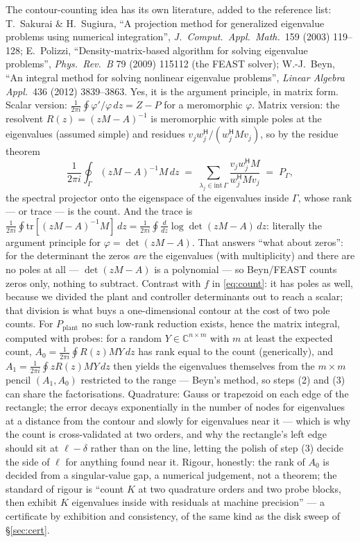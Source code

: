 \documentclass[11pt,a4paper]{article}
\newcommand{\C}{\mathbb{C}}
\newcommand{\hp}{^{\mathsf H}}
\begin{document}
{The contour-counting idea has its own literature, added to the reference list:
T.~Sakurai \& H.~Sugiura, ``A projection method for generalized
eigenvalue problems using numerical integration'', \emph{J.\ Comput.\ Appl.\ Math.}\ 159
(2003) 119--128; E.~Polizzi, ``Density-matrix-based algorithm for solving eigenvalue
problems'', \emph{Phys.\ Rev.\ B} 79 (2009) 115112 (the FEAST solver); W.-J.~Beyn, ``An
integral method for solving nonlinear eigenvalue problems'', \emph{Linear Algebra Appl.}\
436 (2012) 3839--3863.  Yes, it is the argument principle, in matrix form.  Scalar
version: $\tfrac1{2\pi i}\oint\varphi'/\varphi\,dz=Z-P$ for a meromorphic $\varphi$.
Matrix version: the resolvent $R(z)=(zM-A)^{-1}$ is meromorphic with simple poles at the
eigenvalues (assumed simple) and residues $v_jw_j\hp/(w_j\hp Mv_j)$, so by the residue
theorem
\[
\frac1{2\pi i}\oint_\Gamma (zM-A)^{-1}M\,dz
\;=\;\sum_{\lambda_j\in\mathrm{int}\,\Gamma}\frac{v_jw_j\hp M}{w_j\hp Mv_j}
\;=\;P_\Gamma ,
\]
the spectral projector onto the eigenspace of the eigenvalues inside $\Gamma$, whose rank
--- or trace --- is the count.  And the trace is
$\tfrac1{2\pi i}\oint\mathrm{tr}[(zM-A)^{-1}M]\,dz
=\tfrac1{2\pi i}\oint\tfrac{d}{dz}\log\det(zM-A)\,dz$: literally the argument principle
for $\varphi=\det(zM-A)$.  That answers ``what about zeros'': for the determinant the
zeros \emph{are} the eigenvalues (with multiplicity) and there are no poles at all ---
$\det(zM-A)$ is a polynomial --- so Beyn/FEAST counts zeros only, nothing to subtract.
Contrast with $f$ in \eqref{eq:count}: it has poles as well, because we divided the plant
and controller determinants out to reach a scalar; that division is what buys a
one-dimensional contour at the cost of two pole counts.  For $P_{\mathrm{plant}}$ no
such low-rank reduction exists, hence the matrix integral, computed with probes: for a
random $Y\in\C^{n\times m}$ with $m$ at least the expected count,
$A_0=\tfrac1{2\pi i}\oint R(z)MY\,dz$ has rank equal to the count (generically), and
$A_1=\tfrac1{2\pi i}\oint zR(z)MY\,dz$ then yields the eigenvalues themselves from the
$m\times m$ pencil $(A_1,A_0)$ restricted to the range --- Beyn's method, so steps (2)
and (3) can share the factorisations.  Quadrature: Gauss or trapezoid on each edge of the
rectangle; the error decays exponentially in the number of nodes for eigenvalues at a
distance from the contour and slowly for eigenvalues near it --- which is why the count
is cross-validated at two orders, and why the rectangle's left edge should sit at
$\ell-\delta$ rather than on the line, letting the polish of step (3) decide the side of
$\ell$ for anything found near it.  Rigour, honestly: the rank of $A_0$ is decided from a
singular-value gap, a numerical judgement, not a theorem; the standard of rigour is
``count $K$ at two quadrature orders and two probe blocks, then exhibit $K$ eigenvalues
inside with residuals at machine precision'' --- a certificate by exhibition and
consistency, of the same kind as the disk sweep of \S\ref{sec:cert}.
}
\end{document}

